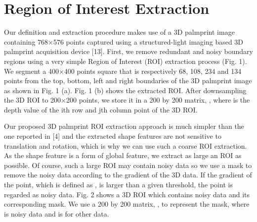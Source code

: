 \section{Region of Interest Extraction}
\label{sec:methodology:roiextraction}

Our definition and extraction procedure makes use of a 3D palmprint image containing 768×576 points captured using a structured-light imaging based 3D palmprint acquisition device [13]. First, we remove redundant and noisy boundary regions using a very simple Region of Interest (ROI) extraction process (Fig. 1). We segment a 400×400 points square that is respectively 68, 108, 234 and 134 points from the top, bottom, left and right boundaries of the 3D palmprint image as shown in Fig. 1 (a). Fig. 1 (b) shows the extracted ROI. After downsampling the 3D ROI to 200×200 points, we store it in a 200 by 200 matrix,  , where   is the depth value of the ith row and jth column point of the 3D ROI.

Our proposed 3D palmprint ROI extraction approach is much simpler than the one reported in [4] and the extracted shape features are not sensitive to translation and rotation, which is why we can use such a coarse ROI extraction. As the shape feature is a form of global feature, we extract as large an ROI as possible. Of course, such a large ROI may contain noisy data so we use a mask to remove the noisy data according to the gradient of the 3D data. If the gradient of the point, which is defined as  , is larger than a given threshold, the point is regarded as noisy data. Fig. 2 shows a 3D ROI which contains noisy data and its corresponding mask. We use a 200 by 200 matrix,  , to represent the mask, where   is noisy data and   is for other data.